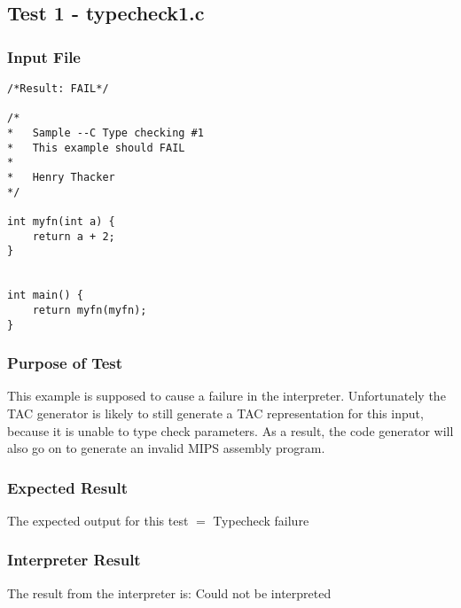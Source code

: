 \subsection{Test 1 - typecheck1.c}
\subsubsection{Input File}
\begin{lstlisting}[showstringspaces=false,breaklines=true,backgroundcolor=\color{light-gray}, captionpos=b]
/*Result: FAIL*/

/*
*	Sample --C Type checking #1
*	This example should FAIL
*
*	Henry Thacker
*/

int myfn(int a) {
	return a + 2;
}


int main() {
	return myfn(myfn);
}
\end{lstlisting}
\subsubsection{Purpose of Test}
This example is supposed to cause a failure in the interpreter. Unfortunately the TAC generator is likely to still generate a TAC representation for this input, because it is unable to type check parameters. As a result, the code generator will also go on to generate an invalid MIPS assembly program.
\subsubsection{Expected Result}
The expected output for this test $=$ Typecheck failure
\subsubsection{Interpreter Result}
The result from the interpreter is: Could not be interpreted
